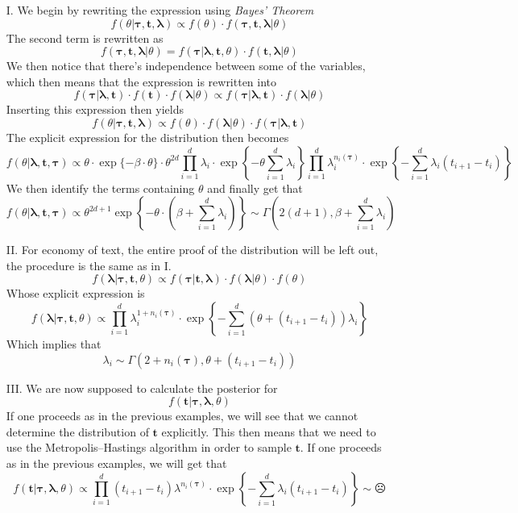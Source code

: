 \begin{itemize}
\item[I.] We begin by rewriting the expression using \textit{Bayes' Theorem}
\[f(\theta| \boldsymbol{\tau}, \boldsymbol{t}, \boldsymbol{\lambda}) \propto f(\theta) \cdot f(\boldsymbol{\tau}, \boldsymbol{t}, \boldsymbol{\lambda}|\theta) \]
The second term is rewritten as
\[f(\boldsymbol{\tau}, \boldsymbol{t}, \boldsymbol{\lambda}|\theta) = f(\boldsymbol{\tau}|\boldsymbol{\lambda},\boldsymbol{t},\theta) \cdot f(\boldsymbol{t},\boldsymbol{\lambda}|\theta) \]
We then notice that there's independence between some of the variables, which then means that the expression is rewritten into
\[ f(\boldsymbol{\tau}|\boldsymbol{\lambda},\boldsymbol{t})\cdot f(\boldsymbol{t}) \cdot f(\boldsymbol{\lambda}|\theta) \propto f(\boldsymbol{\tau}|\boldsymbol{\lambda},\boldsymbol{t}) \cdot f(\boldsymbol{\lambda}|\theta) \]
Inserting this expression then yields
\[ f(\theta| \boldsymbol{\tau}, \boldsymbol{t}, \boldsymbol{\lambda}) \propto f(\theta) \cdot  f(\boldsymbol{\lambda}|\theta)  \cdot f(\boldsymbol{\tau}|\boldsymbol{\lambda},\boldsymbol{t})\]
The explicit expression for the distribution then becomes
\[ f(\theta | \boldsymbol{\lambda},\boldsymbol{t},\boldsymbol{\tau}) \propto \theta \cdot \exp\{-\beta\cdot\theta\}\cdot \theta^{2d}\prod^d_{i = 1}\lambda_i\cdot \exp \left \{ -\theta \sum^d_{i=1}\lambda_i \right \}\prod^d_{i=1}\lambda_i^{n_i(\boldsymbol{\tau})}\cdot \exp \left \{ - \sum^d_{i = 1}\lambda_i(t_{i+1} - t_i) \right \} \]
We then identify the terms containing $\theta$ and finally get that
\[f(\theta | \boldsymbol{\lambda},\boldsymbol{t},\boldsymbol{\tau}) \propto \theta^{2d + 1}\exp\left \{ -\theta \cdot \left ( \beta + \sum^d_{i = 1}\lambda_i \right) \right \} \sim \Gamma\left (2(d + 1), \beta + \sum^d_{i = 1}\lambda_i\right )\]
\item[II.] For economy of text, the entire proof of the distribution will be left out, the procedure is the same as in I. 
\[f(\boldsymbol{\lambda} | \boldsymbol{\tau},\boldsymbol{t}, \theta) \propto f(\boldsymbol{\tau} | \boldsymbol{t}, \boldsymbol{\lambda}) \cdot f(\boldsymbol{\lambda}|\theta) \cdot f(\theta) \]
Whose explicit expression is
\[f(\boldsymbol{\lambda} | \boldsymbol{\tau},\boldsymbol{t}, \theta) \propto \prod^d_{i=1}\lambda_i^{1 + n_i(\boldsymbol{\tau})}\cdot \exp\left \{ - \sum^d_{i = 1}(\theta + (t_{i+1} - t_i))\lambda_i \right \}  \]
Which implies that 
\[ \lambda_i \sim\Gamma \left ( 2 + n_i(\boldsymbol{\tau}), \theta + (t_{i+1} - t_i) \right ) \]
\item[III.] We are now supposed to calculate the posterior for 
\[f(\boldsymbol{t} | \boldsymbol{\tau},\boldsymbol{\lambda},\theta) \]
If one proceeds as in the previous examples, we will see that we cannot determine the distribution of $\boldsymbol{t}$ explicitly. This then means that we need to use the Metropolis--Hastings algorithm in order to sample $\boldsymbol{t}$. If one proceeds as in the previous examples, we will get that 
\[f(\boldsymbol{t} | \boldsymbol{\tau},\boldsymbol{\lambda},\theta) \propto \prod^d_{i = 1}(t_{i+1} - t_i)\lambda^{n_i(\boldsymbol{\tau})}\cdot\exp \left \{ -\sum^d_{i = 1}\lambda_i(t_{i+1} - t_i) \right \} \sim \frownie\]
\end{itemize}

